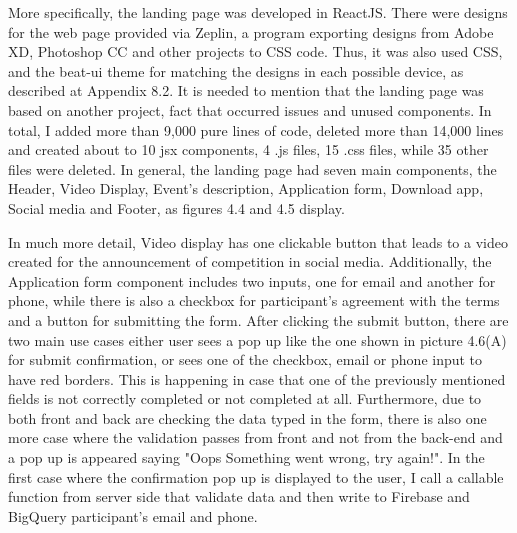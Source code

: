 More specifically, the landing page was developed in ReactJS. There were designs for the web page provided via Zeplin, a program exporting designs from Adobe XD, Photoshop CC and other projects to CSS code. Thus, it was also used CSS, and the beat-ui theme for matching the designs in each possible device, as described at Appendix 8.2. It is needed to mention that the landing page was based on another project, fact that occurred issues and unused components. In total, I added more than 9,000 pure lines of code, deleted more than 14,000 lines and created about to 10 jsx components, 4 .js files, 15 .css files, while 35 other files were deleted. In general, the landing page had seven main components, the Header, Video Display, Event's description, Application form, Download app, Social media and Footer, as figures 4.4 and 4.5 display. \par

In much more detail, Video display has one clickable button that leads to a video created for the announcement of competition in social media. Additionally, the Application form component includes two inputs, one for email and another for phone, while there is also a checkbox for participant's agreement with the terms and a button for submitting the form. After clicking the submit button, there are two main use cases either user sees a pop up like the one shown in picture 4.6(A) for submit confirmation, or sees one of the checkbox, email or phone input to have red borders. This is happening in case that one of the previously mentioned fields is not correctly completed or not completed at all. Furthermore, due to both front and back are checking the data typed in the form, there is also one more case where the validation passes from front and not from the back-end and a pop up is appeared saying "Oops Something went wrong, try again!". In the first case where the confirmation pop up is displayed to the user, I call a callable function from server side that validate data and then write to Firebase and BigQuery participant's email and phone. \par

